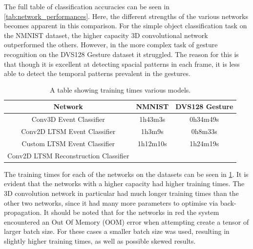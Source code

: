 The full table of classification accuracies can be seen in \cref{tab:network_performances}. Here, the different strengths of the various networks becomes apparent in this comparison. For the simple object classification task on the NMNIST dataset, the higher capacity 3D convolutional network outperformed the others. However, in the more complex task of gesture recognition on the DVS128 Gesture dataset it struggled. The reason for this is that though it is excellent at detecting spacial patterns in each frame, it is less able to detect the temporal patterns prevalent in the gestures.

\begin{table}[htb]
    \centering
    \begin{tabular}{|| c | c | c ||}
        \hline
        Network     & NMNIST & DVS128 Gesture \\
        \hline \hline
        Conv3D Event Classifier          & 1h43m3s   &   0h34m49s    \\
        \hline
        Conv2D LTSM Event Classifier         & 1h3m9s   &    0h8m33s    \\
        \hline
        Custom LTSM Event Classifier         &  1h12m10s  &    \color{red} 1h24m19s \color{black}    \\
        \hline
        Conv2D LTSM Reconstruction Classifier           &     &      \\
        \hline
    \end{tabular}
    \caption{A table showing training times various models.}
    \label{tab:network_training_times}
\end{table}

The training times for each of the networks on the datasets can be seen in \cref{tab:network_training_times}. It is evident that the networks with a higher capacity had higher training times. The 3D convolution network in particular had much longer training times than the other two networks, since it had many more parameters to optimise via back-propagation. It should be noted that for the networks in \color{red} red \color{black} the system encountered an Out Of Memory (OOM) error when attempting create a tensor of larger batch size. For these cases a smaller batch size was used, resulting in slightly higher training times, as well as possible skewed results.